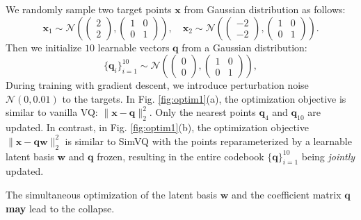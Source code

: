 We randomly sample two target points $\bm{x}$ from Gaussian distribution as follows:
\begin{equation}
    \bm{x}_1 \sim \mathcal{N}(
    \left(
    \begin{matrix}
    2\\
    2
    \end{matrix}
    \right), 
    \left(
    \begin{matrix}
    1 & 0\\
    0 & 1
    \end{matrix}
    \right)
    ),\quad \bm{x}_2 \sim \mathcal{N}(
    \left(
    \begin{matrix}
    -2\\
    -2
    \end{matrix}
    \right), 
    \left(
    \begin{matrix}
    1 & 0\\
    0 & 1
    \end{matrix}
    \right)
    ).
\end{equation}
Then we initialize $10$ learnable vectors $\bm{q}$ from a Gaussian distribution:
\begin{equation}
    \{\bm{q}_i\}_{i=1}^{10} \sim \mathcal{N}(
    \left(
    \begin{matrix}
    0\\
    0
    \end{matrix}
    \right), 
    \left(
    \begin{matrix}
    1 & 0\\
    0 & 1
    \end{matrix}
    \right)
    ),
\end{equation}
During training with gradient descent, we introduce perturbation noise $\mathcal{N}(0,0.01)$ to the targets. In Fig. \ref{fig:optim1}(a), the optimization objective is similar to vanilla VQ: $\|\bm{x}-\bm{q}\|^2_2$. Only the nearest points $\bm{q}_4$ and $\bm{q}_{10}$ are updated. In contrast, in Fig. \ref{fig:optim1}(b), the optimization objective $\|\bm{x}-\bm{q}\bm{w}\|^2_2$ is similar to SimVQ with the points reparameterized by a learnable latent basis $\bm{w}$ and $\bm{q}$ frozen, resulting in the entire codebook $\{\bm{q}\}_{i=1}^{10}$ %
being \textit{jointly} updated.

\begin{remark}
The simultaneous optimization of the latent basis $\bm{w}$ and the coefficient matrix $\bm{q}$ \textbf{may} lead to the collapse. 
\end{remark}

